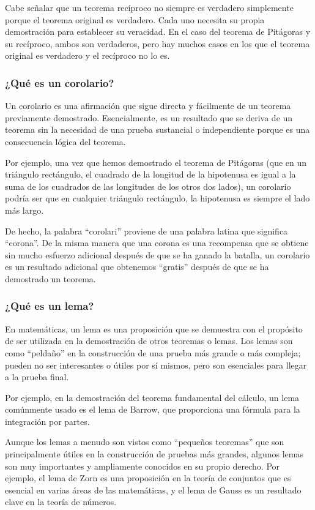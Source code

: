 Cabe señalar que un teorema recíproco no siempre es verdadero simplemente porque el teorema original es verdadero. Cada uno necesita su propia demostración para establecer su veracidad. En el caso del teorema de Pitágoras y su recíproco, ambos son verdaderos, pero hay muchos casos en los que el teorema original es verdadero y el recíproco no lo es.

\subsubsection{¿Qué es un corolario?}

Un corolario es una afirmación que sigue directa y fácilmente de un teorema previamente demostrado. Esencialmente, es un resultado que se deriva de un teorema sin la necesidad de una prueba sustancial o independiente porque es una consecuencia lógica del teorema.

Por ejemplo, una vez que hemos demostrado el teorema de Pitágoras (que en un triángulo rectángulo, el cuadrado de la longitud de la hipotenusa es igual a la suma de los cuadrados de las longitudes de los otros dos lados), un corolario podría ser que en cualquier triángulo rectángulo, la hipotenusa es siempre el lado más largo.

De hecho, la palabra ``corolari'' proviene de una palabra latina que significa ``corona''. De la misma manera que una corona es una recompensa que se obtiene sin mucho esfuerzo adicional después de que se ha ganado la batalla, un corolario es un resultado adicional que obtenemos ``gratis'' después de que se ha demostrado un teorema.

\subsubsection{¿Qué es un lema?}

En matemáticas, un lema es una proposición que se demuestra con el propósito de ser utilizada en la demostración de otros teoremas o lemas. Los lemas son como ``peldaño'' en la construcción de una prueba más grande o más compleja; pueden no ser interesantes o útiles por sí mismos, pero son esenciales para llegar a la prueba final.

Por ejemplo, en la demostración del teorema fundamental del cálculo, un lema comúnmente usado es el lema de Barrow, que proporciona una fórmula para la integración por partes.

Aunque los lemas a menudo son vistos como ``pequeños teoremas'' que son principalmente útiles en la construcción de pruebas más grandes, algunos lemas son muy importantes y ampliamente conocidos en su propio derecho. Por ejemplo, el lema de Zorn es una proposición en la teoría de conjuntos que es esencial en varias áreas de las matemáticas, y el lema de Gauss es un resultado clave en la teoría de números.

